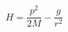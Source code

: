 \begin{equation}
H= \frac{ p^{2}}{2M}  - \frac{g}{r^{2}}
\; 
\label{eq:2D_ISP_Hamiltonian_unregularized}
\end{equation}

